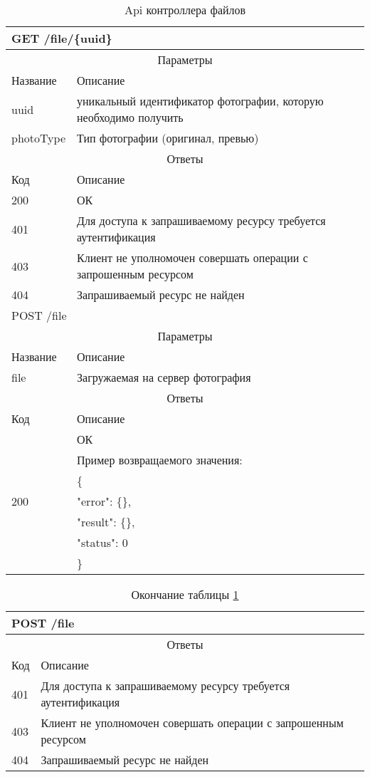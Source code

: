\begin{table}[H]
  \caption{Api контроллера файлов}\label{api-files-table}
  \begin{tabular}{|p{6cm}|p{10cm}|}
  \hline \multicolumn{2}{|l|}{GET /file/\{uuid\}} \\
  \hline \multicolumn{2}{|c|}{Параметры} \\
  \hline Название & Описание \\
  \hline uuid & уникальный идентификатор фотографии, которую необходимо получить \\
  \hline photoType & Тип фотографии (оригинал, превью) \\
  \hline \multicolumn{2}{|c|}{Ответы} \\
  \hline Код & Описание \\
  \hline \multirow{1}{=}{200} & ОК \\
  \hline 401 & Для доступа к запрашиваемому ресурсу требуется аутентификация \\
  \hline 403 & Клиент не уполномочен совершать операции с запрошенным ресурсом \\
  \hline 404 & Запрашиваемый ресурс не найден \\
  \hline \multicolumn{2}{|l|}{POST /file} \\
  \hline \multicolumn{2}{|c|}{Параметры} \\
  \hline Название & Описание \\
  \hline file & Загружаемая на сервер фотография \\
  \hline \multicolumn{2}{|c|}{Ответы} \\
  \hline Код & Описание \\
  \hline \multirow{7}{=}{200} & ОК \\
   & Пример возвращаемого значения: \\
   & \{ \\
   & "error": \{\}, \\
   & "result": \{\}, \\
   & "status": 0 \\
   & \} \\
  \end{tabular}
\end{table}
\begin{table}[H]
  \caption*{Окончание таблицы \ref{api-files-table}}
  \begin{tabular}{|p{6cm}|p{10cm}|}
  \hline \multicolumn{2}{|l|}{POST /file} \\
  \hline \multicolumn{2}{|c|}{Ответы} \\
  \hline Код & Описание \\
  \hline 401 & Для доступа к запрашиваемому ресурсу требуется аутентификация \\
  \hline 403 & Клиент не уполномочен совершать операции с запрошенным ресурсом \\
  \hline 404 & Запрашиваемый ресурс не найден \\
  \hline
  \end{tabular}
\end{table}

